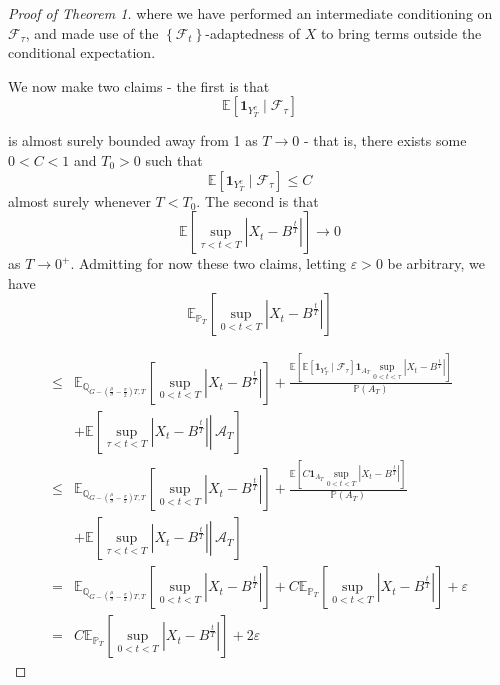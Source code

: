 \documentclass{article}
\theoremstyle{definition}
\theoremstyle{definition}
\begin{document}
\begin{proof}[Proof of Theorem 1]
where we have performed an intermediate conditioning on $\mathcal{F}_{\tau}$, and made use of the $\left\{\mathcal{F}_{t}\right\}$-adaptedness of $X$ to bring terms outside the conditional expectation.

We now make two claims - the first is that
$$\mathbb{E}\left[\mathbf{1}_{Y_{T}^{c}} \mid \mathcal{F}_{\tau}\right]$$

is almost surely bounded away from 1 as $T \rightarrow 0$ - that is, there exists some $0<C<1$ and $T_{0}>0$ such that
\begin{equation}\label{claim1}
\mathbb{E}\left[\mathbf{1}_{Y_{T}^{c}} \mid \mathcal{F}_{\tau}\right] \leq C 
\end{equation}
almost surely whenever $T<T_{0}$. The second is that
\begin{equation}\label{claim2}
\mathbb{E}\left[\sup _{\tau<t<T}\left |X_{t}-B^{\frac{t}{T}}\right | \right ] \to 0 \end{equation}
as $T \rightarrow 0^{+}$. Admitting for now these two claims, letting $\varepsilon>0$ be arbitrary, we have
$$\mathbb{E}_{\mathbb{P}_{T}}\left[\sup _{0<t<T}\left|X_{t}-B^{\frac{t}{T}}\right|\right]$$

$$
\begin{aligned}
\leq & \mathbb E_{\mathbb{Q}_{G-(\frac{\mu}{\sigma}-\frac{\sigma}{2})T, T}}\left[\sup _{0<t<T}\left|X_{t}-B^{\frac{t}{T}}\right|\right]+\frac{\mathbb{E}\left[\mathbb{E}\left[\mathbf{1}_{Y_{T}^{c}} \mid \mathcal{F}_{\tau}\right] \mathbf{1}_{A_{T}} \sup _{0<t<\tau}\left|X_{t}-B^{\frac{t}{T}}\right|\right]}{\mathbb{P}\left(A_{T}\right)} \\
& +\mathbb{E}\left[\left.\sup _{\tau<t<T}\left|X_{t}-B^{\frac{t}{T}}\right| \right\rvert\, \mathcal{A}_{T}\right] \\
\leq & \mathbb E_{\mathbb{Q}_{G-(\frac{\mu}{\sigma}-\frac{\sigma}{2})T, T}}\left[\sup _{0<t<T}\left|X_{t}-B^{\frac{t}{T}}\right|\right]+\frac{\mathbb{E}\left[C \mathbf{1}_{A_{T}} \sup _{0<t<T}\left|X_{t}-B^{\frac{t}{T}}\right|\right]}{\mathbb{P}\left(A_{T}\right)} \\
& +\mathbb{E}\left[\left.\sup _{\tau<t<T}\left|X_{t}-B^{\frac{t}{T}}\right| \right\rvert\, \mathcal{A}_{T}\right] \\
= & \mathbb E_{\mathbb{Q}_{G-(\frac{\mu}{\sigma}-\frac{\sigma}{2})T, T}}[\sup_{0<t<T} |X_{t}-B^{\frac{t}{T}}|]+C \mathbb{E}_{\mathbb{P}_{T}} [\sup_{0<t<T} |X_t-B^{\frac{t}{T}}|]+\varepsilon \\
= & C \mathbb{E}_{\mathbb{P}_{T}}\left[\sup _{0<t<T}\left|X_{t}-B^{\frac{t}{T}}\right|\right]+2 \varepsilon
\end{aligned}
$$


\end{proof}
\end{document}
